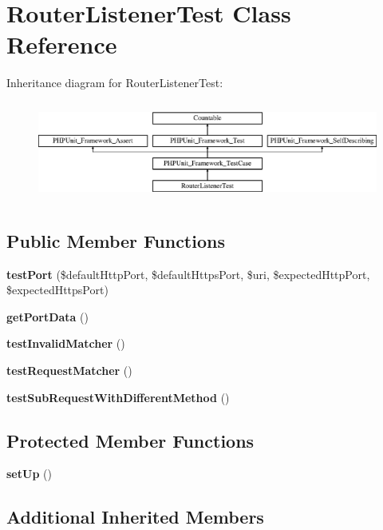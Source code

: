 \section{Router\+Listener\+Test Class Reference}
\label{class_symfony_1_1_component_1_1_http_kernel_1_1_tests_1_1_event_listener_1_1_router_listener_test}
Inheritance diagram for Router\+Listener\+Test\+:\begin{figure}[H]
\begin{center}
\leavevmode
\includegraphics[height=3.303835cm]{class_symfony_1_1_component_1_1_http_kernel_1_1_tests_1_1_event_listener_1_1_router_listener_test}
\end{center}
\end{figure}
\subsection*{Public Member Functions}
\begin{DoxyCompactItemize}
\item 
{\bf test\+Port} (\$default\+Http\+Port, \$default\+Https\+Port, \$uri, \$expected\+Http\+Port, \$expected\+Https\+Port)
\item 
{\bf get\+Port\+Data} ()
\item 
{\bf test\+Invalid\+Matcher} ()
\item 
{\bf test\+Request\+Matcher} ()
\item 
{\bf test\+Sub\+Request\+With\+Different\+Method} ()
\end{DoxyCompactItemize}
\subsection*{Protected Member Functions}
\begin{DoxyCompactItemize}
\item 
{\bf set\+Up} ()
\end{DoxyCompactItemize}
\subsection*{Additional Inherited Members}


